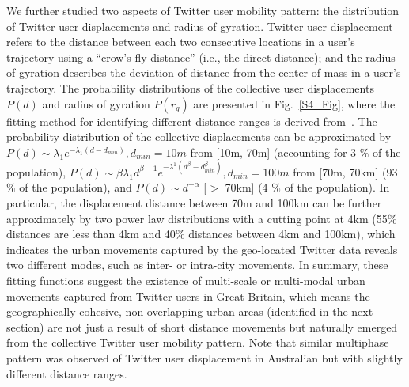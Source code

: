 \documentclass[10pt,letterpaper]{article}
\begin{document}
We further studied two aspects of Twitter user mobility pattern: the distribution of Twitter user displacements and radius of gyration. 
Twitter user displacement refers to the distance between each two consecutive locations in a user’s trajectory using a “crow's fly distance” (i.e., the direct distance); and the radius of gyration describes the deviation of distance from the center of mass in a user’s trajectory.
The probability distributions of the collective user displacements $P(d)$ and radius of gyration $P(r_g)$ are presented in Fig.~\ref{S4_Fig}, where the fitting method for identifying different distance ranges is derived from~\cite{jurdak2015}.
The probability distribution of the collective displacements can be approximated by $P(d) \sim \lambda_{1} e^{-\lambda_{1}(d - d_{min})}, d_{min}=10m$ from [10m, 70m] (accounting for 3 $\%$ of the population),  $ P(d) \sim \beta\lambda_{1}d^{\beta-1}e^{-\lambda^{1}(d^\beta-d_{min}^\beta)}, d_{min} = 100m$ from [70m, 70km] (93 $\%$ of the population), and $P(d) \sim {d}^{-\alpha}$ [$>$ 70km] (4 $\%$ of the population). 
In particular, the displacement distance between 70m and 100km can be further approximately by two power law distributions with a cutting point at 4km (55$\%$ distances are less than 4km and 40$\%$ distances between 4km and 100km), which indicates the urban movements captured by the geo-located Twitter data reveals two different modes, such as inter- or intra-city movements. 
In summary, these fitting functions suggest the existence of multi-scale or multi-modal urban movements captured from Twitter users in Great Britain, which means the geographically cohesive, non-overlapping urban areas (identified in the next section) are not just a result of short distance movements but naturally emerged from the collective Twitter user mobility pattern.
Note that similar multiphase pattern was observed of Twitter user displacement in Australian but with slightly different distance ranges\cite{jurdak2015}.
\end{document}
